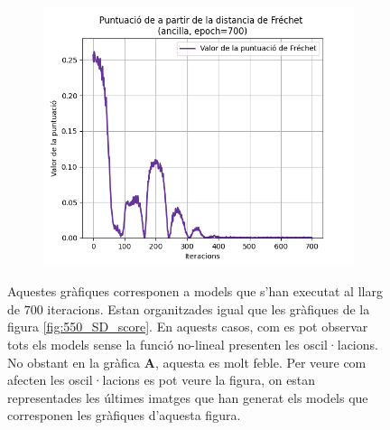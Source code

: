 \begin{figure}
\begin{subfigure}[b]{.32\linewidth}
		\includegraphics[width=\linewidth]{figures/data/FD_score_A6.png}
		\caption{}
	\end{subfigure}
	\caption{Aquestes gràfiques corresponen a models que s'han executat al llarg de $700$ iteracions. Estan organitzades igual que les gràfiques de la figura \ref{fig:550_SD_score}. En aquests casos, com es pot observar tots els models sense la funció no-lineal presenten les oscil·lacions. No obstant en la gràfica \textbf{A}, aquesta es molt feble. Per veure com afecten les oscil·lacions es pot veure la figura, on estan representades les últimes imatges que han generat els models que corresponen les gràfiques d'aquesta figura.}
	\label{fig:700_SD_score}
\end{figure}

